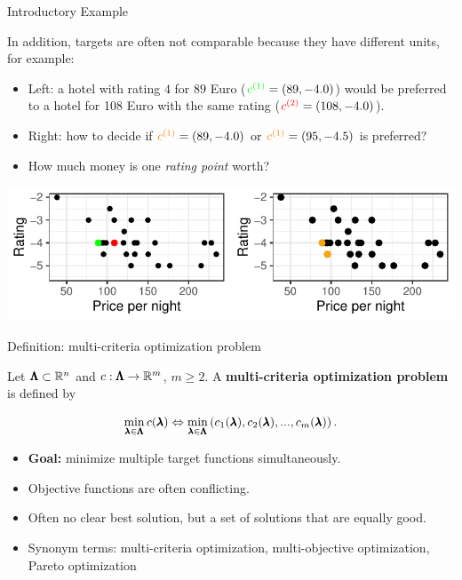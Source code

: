 \begin{frame}[allowframebreaks]{Introductory Example}
\framebreak

In addition, targets are often not comparable because they have different units, for example:

\begin{itemize}
    \item Left: a hotel with rating $4$ for $89$ Euro ($\textcolor{green}{c^{(1)}} = \left(89, - 4.0\right)$) would be preferred to a hotel for 108 Euro with the same rating ($\textcolor{red}{c^{(2)}} = \left(108, - 4.0\right)$).
\item Right: how to decide if $\textcolor{orange}{c^{(1)}} = \left(89, - 4.0\right)$ or $\textcolor{orange}{c^{(1)}} = \left(95, - 4.5\right)$ is preferred?
\item How much money is one \textit{rating point} worth?
\end{itemize}

\centering \includegraphics[scale=1]{images/expedia-2-1}

\end{frame}


\begin{frame}{Definition: multi-criteria optimization problem}

Let $\pmb{\Lambda} \subset \mathbb{R}^n$ and $c: \pmb{\Lambda} \to \mathbb{R}^m$, $m \ge 2$. A \textbf{multi-criteria optimization problem} is defined by

$$
\min_{\pmb{\lambda} \in \pmb{\Lambda}}  c(\pmb{\lambda}) \Leftrightarrow \min_{\pmb{\lambda} \in \pmb{\Lambda}} \left(c_1(\pmb{\lambda}), c_2(\pmb{\lambda}), ..., c_m(\pmb{\lambda})\right).
$$

\begin{itemize}
\item \textbf{Goal:} minimize multiple target functions simultaneously.
\item Objective functions are often conflicting.
\item Often no clear best solution, but a set of solutions that are equally good.
\item Synonym terms: multi-criteria optimization, multi-objective optimization, Pareto optimization
\end{itemize}

\end{frame}

